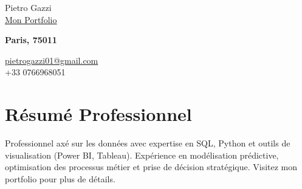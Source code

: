 \documentclass[letterpaper,10.5pt]{article}
\begin{document}
\begin{center}
    {\LARGE Pietro Gazzi}\\
    \href{https://pietrowei.github.io/Portfolio/index_fr.html}{\large{\underline{Mon Portfolio}}}\\
    \begin{multicols}{2}
        \begin{flushleft}
            \textbf{Paris, 75011}
        \end{flushleft}
        \begin{flushright}
            \href{mailto:pietrogazzi01@gmail.com}{pietrogazzi01@gmail.com}\\
            +33 0766968051
        \end{flushright}
    \end{multicols}
\end{center}

\section*{Résumé Professionnel}
Professionnel axé sur les données avec expertise en SQL, Python et outils de visualisation (Power BI, Tableau). Expérience en modélisation prédictive, optimisation des processus métier et prise de décision stratégique. Visitez mon portfolio pour plus de détails.

\end{document}

